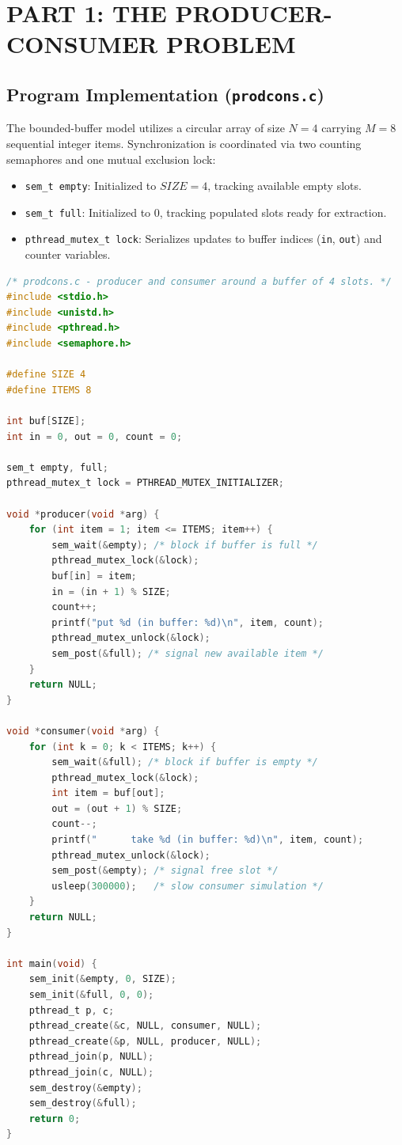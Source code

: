 \documentclass[12pt,a4paper]{report}
\numberwithin{equation}{chapter}
\numberwithin{figure}{chapter}
\numberwithin{table}{chapter}
\begin{document}
\chapter{PART 1: THE PRODUCER-CONSUMER PROBLEM}

\section{Program Implementation (\texttt{prodcons.c})}
The bounded-buffer model utilizes a circular array of size $N=4$ carrying $M=8$ sequential integer items. Synchronization is coordinated via two counting semaphores and one mutual exclusion lock:
\begin{itemize}
    \item \texttt{sem\_t empty}: Initialized to $SIZE = 4$, tracking available empty slots.
    \item \texttt{sem\_t full}: Initialized to $0$, tracking populated slots ready for extraction.
    \item \texttt{pthread\_mutex\_t lock}: Serializes updates to buffer indices (\texttt{in}, \texttt{out}) and counter variables.
\end{itemize}

\begin{lstlisting}[language=C]
/* prodcons.c - producer and consumer around a buffer of 4 slots. */
#include <stdio.h>
#include <unistd.h>
#include <pthread.h>
#include <semaphore.h>

#define SIZE 4
#define ITEMS 8

int buf[SIZE];
int in = 0, out = 0, count = 0;

sem_t empty, full;
pthread_mutex_t lock = PTHREAD_MUTEX_INITIALIZER;

void *producer(void *arg) {
    for (int item = 1; item <= ITEMS; item++) {
        sem_wait(&empty); /* block if buffer is full */
        pthread_mutex_lock(&lock);
        buf[in] = item;
        in = (in + 1) % SIZE;
        count++;
        printf("put %d (in buffer: %d)\n", item, count);
        pthread_mutex_unlock(&lock);
        sem_post(&full); /* signal new available item */
    }
    return NULL;
}

void *consumer(void *arg) {
    for (int k = 0; k < ITEMS; k++) {
        sem_wait(&full); /* block if buffer is empty */
        pthread_mutex_lock(&lock);
        int item = buf[out];
        out = (out + 1) % SIZE;
        count--;
        printf("      take %d (in buffer: %d)\n", item, count);
        pthread_mutex_unlock(&lock);
        sem_post(&empty); /* signal free slot */
        usleep(300000);   /* slow consumer simulation */
    }
    return NULL;
}

int main(void) {
    sem_init(&empty, 0, SIZE);
    sem_init(&full, 0, 0);
    pthread_t p, c;
    pthread_create(&c, NULL, consumer, NULL);
    pthread_create(&p, NULL, producer, NULL);
    pthread_join(p, NULL);
    pthread_join(c, NULL);
    sem_destroy(&empty);
    sem_destroy(&full);
    return 0;
}
\end{lstlisting}
\end{document}
